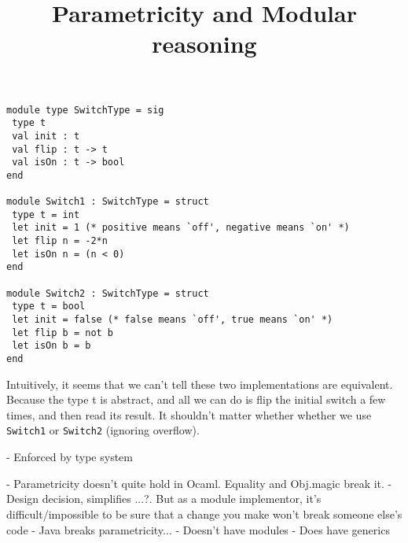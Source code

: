 \documentclass{article}
\title{Parametricity and Modular reasoning}
\begin{document}
\maketitle
\begin{lstlisting}
module type SwitchType = sig
 type t
 val init : t
 val flip : t -> t
 val isOn : t -> bool
end

module Switch1 : SwitchType = struct
 type t = int
 let init = 1 (* positive means `off', negative means `on' *)
 let flip n = -2*n
 let isOn n = (n < 0)
end

module Switch2 : SwitchType = struct
 type t = bool
 let init = false (* false means `off', true means `on' *)
 let flip b = not b
 let isOn b = b
end
\end{lstlisting}

Intuitively, it seems that we can't tell these two implementations are
equivalent. Because the type t is abstract, and all we can do is flip
the initial switch a few times, and then read its result. It shouldn't
matter whether whether we use \lstinline{Switch1} or
\lstinline{Switch2} (ignoring overflow).

- Enforced by type system

- Parametricity doesn't quite hold in Ocaml. Equality and Obj.magic break it.
- Design decision, simplifies ...?. But as a module implementor, it's difficult/impossible to be sure that a change you make won't break someone else's code
- Java breaks parametricity...
 - Doesn't have modules
 - Does have generics
 
\end{document}
